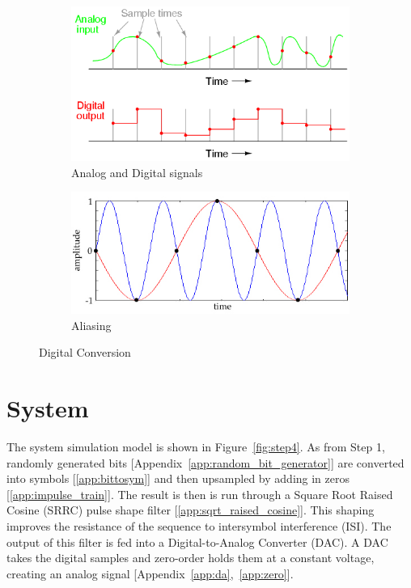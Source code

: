 \documentclass[]{article}
\begin{document}
\begin{figure}[h]
        \centering
        \begin{subfigure}[b]{0.4\textwidth}
                \includegraphics[width=\textwidth]{digitization.png}
                \caption{Analog and Digital signals}
                \label{fig:digitization}
        \end{subfigure}%
        \qquad \quad %
        \begin{subfigure}[b]{0.5\textwidth}
                \includegraphics[width=\textwidth]{aliasing.jpg}
                \caption{Aliasing \label{fig:alias} \cite{aliasing}}
                \label{fig:alias}
        \end{subfigure}
        \caption{Digital Conversion \label{fig:digitize}}
\end{figure}

\section{System}
\label{sec:system}
The system simulation model is shown in Figure~\ref{fig:step4}.  As from Step 1, randomly generated bits [Appendix~\ref{app:random_bit_generator}] are converted into symbols [\ref{app:bittosym}] and then upsampled by adding in zeros [\ref{app:impulse_train}].  The result is then is run through a Square Root Raised Cosine (SRRC) pulse shape filter [\ref{app:sqrt_raised_cosine}].  This shaping improves the resistance of the sequence to intersymbol interference (ISI).  The output of this filter is fed into a Digital-to-Analog Converter (DAC).  A DAC takes the digital samples and zero-order holds them at a constant voltage, creating an analog signal [Appendix~\ref{app:da},~\ref{app:zero}].  \\
\end{document}
